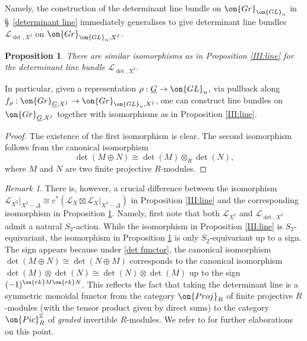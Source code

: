 \documentclass[]{pcmi}
\theoremstyle{plain}
\newtheorem{prop}[equation]{Proposition}
\theoremstyle{remark}
\newtheorem{rmk}[equation]{Remark}
\theoremstyle{definition}
\newcommand{\bZ}{{\mathbb Z}}
\newcommand{\mL}{{\mathcal L}}
\newcommand{\Gr}{{\on{Gr}}}
\newcommand{\Pic}{{\on{Pic}}}
\newcommand{\GL}{{\on{GL}}}
\begin{document}
Namely, the construction of the determinant line bundle on $\Gr_{\GL_n}$ in \S~\ref{determinant line} immediately generalises to give determinant line bundles $\mL_{\det, X^I}$ on $\Gr_{\GL_n,X^I}$.  




\begin{prop}\label{det factorization}
There are similar isomorphisms as in Proposition \ref{III:line} for the determinant line bundle $\mL_{\det,X^I}$. 
\end{prop}
In particular, given a representation $\rho:\underline G\to \GL_n$, via pullback along $f_\rho: \Gr_{\underline G,X^I}\to\Gr_{\GL_n,X^I}$, one can construct line bundles on $\Gr_{\underline G,X^I}$ together with isomorphisms as in Proposition \ref{III:line}.
\begin{proof}The existence of the first isomorphism is clear. The second isomorphism follows from the canonical isomorphism
\begin{equation}\label{det functor}
\det(M\oplus N)\cong \det(M)\otimes_R \det(N),
\end{equation}
where $M$ and $N$ are two finite projective $R$-modules.
\end{proof}


\begin{rmk}\label{graded factorization}
There is, however, a crucial difference between the isomorphism $\mL_{X^2}|_{X^2-\Delta}\cong c^*(\mL_X\boxtimes\mL_X|_{X^2-\Delta})$ in Proposition \ref{III:line} and the corresponding isomorphism in Proposition \ref{det factorization}. Namely, first note that both $\mL_{X^2}$ and $\mL_{\det,X^2}$ admit a natural $S_2$-action. While the isomorphism in Proposition \ref{III:line} is $S_2$-equivariant, the isomorphism in Proposition \ref{det factorization} is only $S_2$-equivariant up to a sign. The sign appears
because under \eqref{det functor}, the canonical isomorphism $\det(M\oplus N)\cong\det(N\oplus M)$ corresponds to the canonical isomorphism $\det(M)\otimes\det(N)\cong\det(N)\otimes\det(M)$ up to the sign $(-1)^{\on{rk}M\on{rk}N}$. This reflects the fact that taking the determinant line is a symmetric monoidal functor from the category $\on{Proj}_R$ of finite projective $R$-modules (with the tensor product given by direct sums) to the category $\Pic^\bZ_R$ of \emph{graded} invertible $R$-modules. We refer to \cite{OZ1} for further elaborations on this point. 
\end{rmk}
\end{document}
